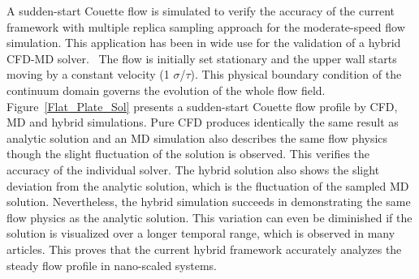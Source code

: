 \documentclass[preprint,12pt]{elsarticle}
\begin{document}
A sudden-start Couette flow is simulated to verify the accuracy of the current framework with multiple replica sampling approach for the moderate-speed flow simulation. This application has been in wide use for the validation of a hybrid CFD-MD solver.~\cite{Nie,Yen} The flow is initially set stationary and the upper wall starts moving by a constant velocity (1 $\sigma$/$\tau$). This physical boundary condition of the continuum domain governs the evolution of the whole flow field. Figure~\ref{Flat_Plate_Sol} presents a sudden-start Couette flow profile by CFD, MD and hybrid simulations.
Pure CFD produces identically the same result as analytic solution and an MD simulation also describes the same flow physics though the slight fluctuation of the solution is observed. This verifies the accuracy of the individual solver. The hybrid solution also shows the slight deviation from the analytic solution, which is the fluctuation of the sampled MD solution. Nevertheless, the hybrid simulation succeeds in demonstrating the same flow physics as the analytic solution. This variation can even be diminished if the solution is visualized over a longer temporal range, which is observed in many articles.
This proves that the current hybrid framework accurately analyzes the steady flow profile in nano-scaled systems.
\end{document}
